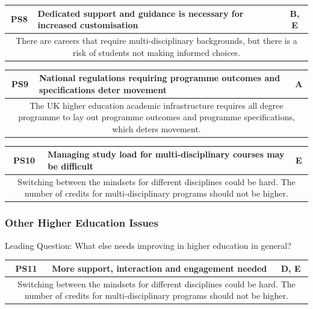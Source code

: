\begin{table}[!ht]
	\begin{tabularx}{\textwidth}{|c|X|c|}
		\hline
		PS8 & \textbf{Dedicated support and guidance is necessary for increased customisation} & B, E \\
		\hline
        \multicolumn{3}{|X|}{There are careers that require multi-disciplinary backgrounds, but there is a risk of 
        students not making informed choices.}                                       \\
		\hline
	\end{tabularx}
\end{table}

\begin{table}[!ht]
	\begin{tabularx}{\textwidth}{|c|X|c|}
		\hline
		PS9 & \textbf{National regulations requiring programme outcomes and specifications deter movement} & A \\
		\hline
        \multicolumn{3}{|X|}{The UK higher education academic infrastructure requires all degree programme to lay out 
        programme outcomes and programme specifications, which deters movement.}                                       \\
		\hline
	\end{tabularx}
\end{table}

\begin{table}[!ht]
	\begin{tabularx}{\textwidth}{|c|X|c|}
		\hline
		PS10 & \textbf{Managing study load for multi-disciplinary courses may be difficult} & E \\
		\hline
        \multicolumn{3}{|X|}{Switching between the mindsets for different disciplines could be hard. 
        The number of credits for multi-disciplinary programs should not be higher.}                      \\
		\hline
	\end{tabularx}
\end{table}

\subsubsection{Other Higher Education Issues}

Leading Question: What else needs improving in higher education in general?

\begin{table}[!ht]
	\begin{tabularx}{\textwidth}{|c|X|c|}
		\hline
		PS11 & \textbf{More support, interaction and engagement needed} & D, E \\
		\hline
        \multicolumn{3}{|X|}{Switching between the mindsets for different disciplines could be hard. 
        The number of credits for multi-disciplinary programs should not be higher.}                      \\
		\hline
	\end{tabularx}
\end{table}

